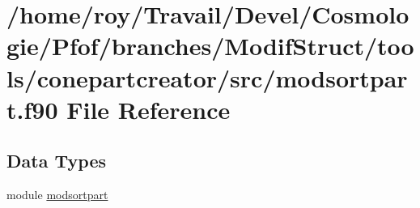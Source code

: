 \hypertarget{conepartcreator_2src_2modsortpart_8f90}{\section{/home/roy/\-Travail/\-Devel/\-Cosmologie/\-Pfof/branches/\-Modif\-Struct/tools/conepartcreator/src/modsortpart.f90 File Reference}
\label{conepartcreator_2src_2modsortpart_8f90}
}
\subsection*{Data Types}
\begin{DoxyCompactItemize}
\item 
module \hyperlink{classmodsortpart}{modsortpart}
\end{DoxyCompactItemize}
